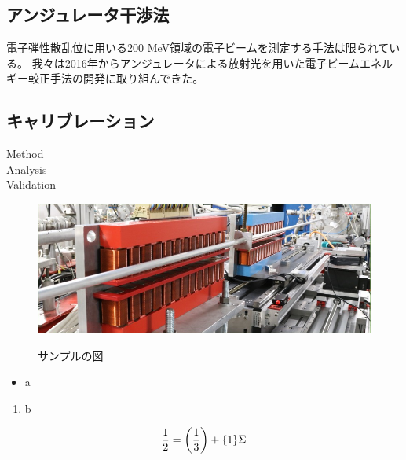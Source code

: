 \documentclass[a4paper,11pt,uplatex]{jsarticle}
\begin{document}
\subsection{アンジュレータ干渉法}
電子弾性散乱位に用いる200 MeV領域の電子ビームを測定する手法は限られている。
我々は2016年からアンジュレータによる放射光を用いた電子ビームエネルギー較正手法の開発に取り組んできた。
\subsection{キャリブレーション}
Method\\
Analysis\\
Validation\\

\clearpage

\begin{figure}[tb]
  \centering
  \includegraphics[width=0.8\linewidth]{image/1-1.jpg}\\
  \caption{サンプルの図}
  \label{sample_image}
\end{figure}

\begin{itemize}
  \item a
\end{itemize}
\begin{enumerate}
  \item b
\end{enumerate}

\begin{align}
\frac{1}{2} = \qty(\frac{1}{3}) + \qty{1}\Sigma
\end{align}
\end{document}
